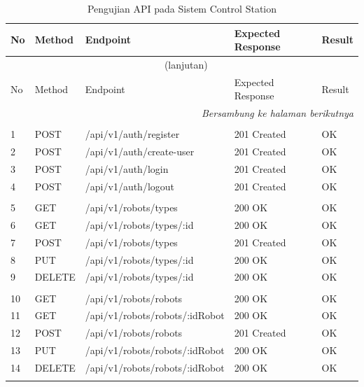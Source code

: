 \begingroup
\scriptsize
\begin{longtable}{p{0.7cm} p{1.4cm} p{7cm} p{2.2cm} p{1.2cm}}
\caption{Pengujian API pada Sistem Control Station} \label{tab:api_testing} \\
\toprule
No & Method & Endpoint & Expected Response & Result \\ \midrule
\endfirsthead

\multicolumn{5}{c}{\tablename~\thetable{} (lanjutan)}\\\toprule
No & Method & Endpoint & Expected Response & Result \\ \midrule
\endhead

\midrule \multicolumn{5}{r}{\textit{Bersambung ke halaman berikutnya}}\\\bottomrule
\endfoot

\bottomrule
\endlastfoot

\multicolumn{5}{l}{\textbf{Autentikasi}}\\
1 & POST & /api/v1/auth/register & 201 Created & OK \\
2 & POST & /api/v1/auth/create-user & 201 Created & OK \\
3 & POST & /api/v1/auth/login & 201 Created & OK \\
4 & POST & /api/v1/auth/logout & 201 Created & OK \\
\addlinespace

\multicolumn{5}{l}{\textbf{Robot Types}}\\
5 & GET & /api/v1/robots/types & 200 OK & OK \\
6 & GET & /api/v1/robots/types/:id & 200 OK & OK \\
7 & POST & /api/v1/robots/types & 201 Created & OK \\
8 & PUT & /api/v1/robots/types/:id & 200 OK & OK \\
9 & DELETE & /api/v1/robots/types/:id & 200 OK & OK \\
\addlinespace

\multicolumn{5}{l}{\textbf{Robots}}\\
10 & GET & /api/v1/robots/robots & 200 OK & OK \\
11 & GET & /api/v1/robots/robots/:idRobot & 200 OK & OK \\
12 & POST & /api/v1/robots/robots & 201 Created & OK \\
13 & PUT & /api/v1/robots/robots/:idRobot & 200 OK & OK \\
14 & DELETE & /api/v1/robots/robots/:idRobot & 200 OK & OK \\
\addlinespace


\end{longtable}
